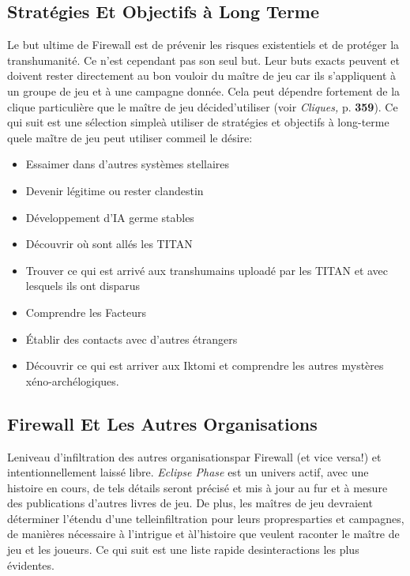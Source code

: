 \subsection{Stratégies Et Objectifs à Long Terme} 

Le but ultime de Firewall est de prévenir les risques existentiels et de protéger la transhumanité. Ce n'est cependant pas son seul but. Leur buts exacts peuvent et doivent rester directement au bon vouloir du maître de jeu car ils s'appliquent à un groupe de jeu et à une campagne donnée. Cela peut dépendre fortement de la clique particulière que le maître de jeu décided'utiliser (voir \textit{Cliques, } p. \textbf{359}). Ce qui suit est une sélection simpleà utiliser de stratégies et objectifs à long-terme quele maĩtre de jeu peut utiliser commeil le désire: 

\begin{itemize} \item Essaimer dans d'autres systèmes stellaires \item Devenir légitime ou rester clandestin \item Développement d'IA germe stables\item Découvrir où sont allés les TITAN \item Trouver ce qui est arrivé aux transhumains uploadé par les TITAN et avec lesquels ils ont disparus \item Comprendre les Facteurs \item Établir des contacts avec d'autres étrangers\item Découvrir ce qui est arriver aux Iktomi et comprendre les autres mystères xéno-archélogiques. \end{itemize} 

\subsection{Firewall Et Les Autres Organisations} 

Leniveau d'infiltration des autres organisationspar Firewall (et vice versa!) et intentionnellement laissé libre. \textit{Eclipse Phase }est un univers actif, avec une histoire en cours, de tels détails seront précisé et mis à jour au fur et à mesure des publications d'autres livres de jeu. De plus, les maîtres de jeu devraient déterminer l'étendu d'une telleinfiltration pour leurs propresparties et campagnes, de manières nécessaire à l'intrigue et àl'histoire que veulent raconter le maître de jeu et les joueurs. Ce qui suit est une liste rapide desinteractions les plus évidentes. 

